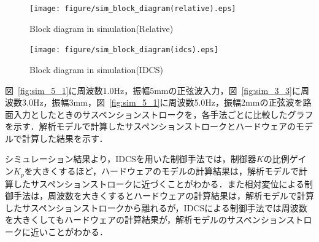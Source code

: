 \documentclass[a4paper,12pt]{article_vdlab_sotsuron}
\begin{document}
\vspace*{5mm}
\begin{figure}[htp]
  \begin{center}
    \texttt{[image: figure/sim\_block\_diagram(relative).eps]}
    \vspace*{3mm}
    \caption{Block diagram in simulation(Relative)}
    \label{fig:sim_block_relative}
  \end{center}
\end{figure}

\begin{figure}[htp]
  \begin{center}
    \texttt{[image: figure/sim\_block\_diagram(idcs).eps]}
    \vspace*{3mm}
    \caption{Block diagram in simulation(IDCS)}
    \label{fig:sim_block_idcs}
  \end{center}
\end{figure}

\newpage
図~\ref{fig:sim_5_1}に周波数1.0Hz，振幅5mmの正弦波入力，図~\ref{fig:sim_3_3}に周波数3.0Hz，振幅3mm，図~\ref{fig:sim_5_1}に周波数5.0Hz，振幅2mmの正弦波を路面入力としたときのサスペンションストロークを，各手法ごとに比較したグラフを示す．解析モデルで計算したサスペンションストロークとハードウェアのモデルで計算した結果を示す．

シミュレーション結果より，IDCSを用いた制御手法では，制御器$K$の比例ゲイン$K_p$を大きくするほど，ハードウェアのモデルの計算結果は，解析モデルで計算したサスペンションストロークに近づくことがわかる．また相対変位による制御手法は，周波数を大きくするとハードウェアの計算結果は，解析モデルで計算したサスペンションストロークから離れるが，IDCSによる制御手法では周波数を大きくしてもハードウェアの計算結果が，解析モデルのサスペンションストロークに近いことがわかる．
\end{document}
